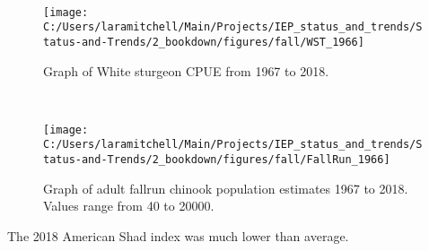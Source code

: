 \documentclass[
]{book}
\begin{document}
\begin{panel-grid}
\begin{columns-nocenter}
\begin{column800}
\end{column800}

\begin{column40}

~

\end{column40}

\begin{column800}

\begin{expand}

\begin{figure}
\texttt{[image: C:/Users/laramitchell/Main/Projects/IEP\_status\_and\_trends/Status-and-Trends/2\_bookdown/figures/fall/WST\_1966]} \caption{Graph of White sturgeon CPUE from 1967 to 2018. }\label{fig:unnamed-chunk-131}
\end{figure}

\end{expand}

\end{column800}

\begin{column40}

~

\end{column40}

\begin{column800}

\begin{expand}

\begin{figure}
\texttt{[image: C:/Users/laramitchell/Main/Projects/IEP\_status\_and\_trends/Status-and-Trends/2\_bookdown/figures/fall/FallRun\_1966]} \caption{Graph of adult fallrun chinook population estimates 1967 to 2018. Values range from 40 to 20000.}\label{fig:unnamed-chunk-132}
\end{figure}

\end{expand}

\end{column800}

\end{columns-nocenter}

\begin{columns-nocenter}

\begin{column800}

The 2018 American Shad index was much lower than average.

\end{column800}


\end{columns-nocenter}
\end{panel-grid}
\end{document}
